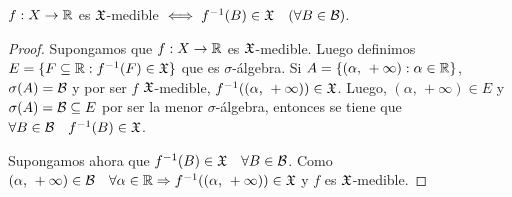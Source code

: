 \begin{prop}
    $f: X \to \mathbb{R}$ es $\mathfrak{X}$-medible $\iff f^{-1}(B) \in \mathfrak{X} \quad (\forall B \in \mathcal{B})$.
    \begin{proof}
        Supongamos que $f : X \to \mathbb{R}$ es $\mathfrak{X}$-medible. Luego definimos $E = \{ F \subseteq \mathbb{R} : f^{-1}(F) \in \mathfrak{X} \}$ que es $\sigma$-álgebra.
        Si $A = \{ (\alpha\text{, } +\infty) : \alpha \in \mathbb{R} \}$, $\sigma(A) = \mathcal{B}$ y por ser $f$ $\mathfrak{X}$-medible, $f^{-1}((\alpha\text{, } +\infty)) \in \mathfrak{X}$.
        Luego, $(\alpha \text{, } +\infty) \in E$ y $\sigma(A) = \mathcal{B} \subseteq E$ por ser la menor $\sigma$-álgebra, entonces se tiene que $\forall B \in \mathcal{B} \quad f^{-1}(B) \in \mathfrak{X}$.

        Supongamos ahora que $f^{-1}(B) \in \mathfrak{X} \quad \forall B \in \mathcal{B}$.
        Como $(\alpha \text{, } +\infty) \in \mathcal{B} \quad \forall \alpha \in \mathbb{R} \Rightarrow f^{-1}((\alpha \text{, } +\infty)) \in \mathfrak{X}$ y $f$ es $\mathfrak{X}$-medible.
    \end{proof}
\end{prop}


